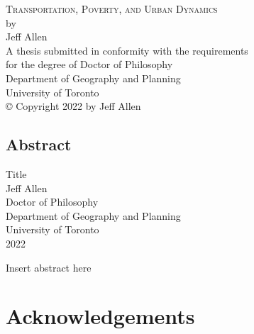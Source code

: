 \documentclass[11 pt, letterpaper]{report}
\begin{document}
	
{\begin{titlepage}
		\large
		\singlespacing
		\begin{center}
			\mbox{}
			\vfill
			\textsc{Transportation, Poverty, and Urban Dynamics}\\
			\vfill
			by \\
			\vfill
			{Jeff Allen}\\
			\vfill
			\vfill
			A thesis submitted in conformity with the requirements \\
			for the degree of Doctor of Philosophy  \\
			Department of Geography and Planning \\
			University of Toronto \\
			\vfill
			{\copyright} Copyright 2022 by Jeff Allen\\
			\vspace{.01\textheight}
			\mbox{}
		\end{center}
		\setcounter{page}{1}
	\end{titlepage}
	\setcounter{page}{2}}






\renewcommand{\thepage}{\roman{page}}%

\newpage



\begin{center}
\section*{Abstract}
	\singlespacing
	{Title}\\[2ex]
	{Jeff Allen}\\
	{Doctor of Philosophy}\\
	Department of Geography and Planning\\
	University of Toronto\\
	{2022}\\
\end{center}
Insert abstract here



\vspace{12mm}



\newpage


\chapter*{\Large{Acknowledgements}}
\end{document}
